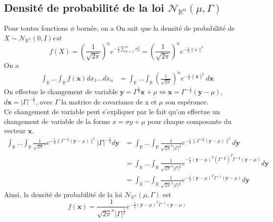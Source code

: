 \documentclass{report}
\begin{document}
		\subsection{Densité de probabilité de la loi $\mathcal{N}_{\mathbb{R}^n}(\mu, \Gamma)$}
			Pour toutes fonctions $\phi$ bornée, on a
			On sait que la densité de probabilité de $X \sim \mathcal{N}_{\mathbb{R}^n}(0, I) est $
			\[ f(X) = (\frac{1}{\sqrt{2\pi}})^ne^{-\frac{1}{2}\sum\limits_{k=1}^{n}x_k^2} = (\frac{1}{\sqrt{2\pi}})^ne^{-\frac{1}{2} \lVert x \rVert^2}  \]
			On a 
			\begin{align*}
				\int_\mathbb{R} \ldots \int_\mathbb{R} f(\textbf{x}) dx_1 \ldots dx_n &= \int_\mathbb{R} \ldots \int_\mathbb{R} (\frac{1}{\sqrt{2\pi}})^ne^{-\frac{1}{2} \lVert \textbf{x} \rVert^2} d\textbf{x}
			\end{align*}
			On effectue le changement de variable $\textbf{y} = \Gamma^{\frac{1}{2}} \textbf{x} + \mu \Leftrightarrow \textbf{x} = \Gamma^{-\frac{1}{2}}(\textbf{y} - \mu)$, $d\textbf{x} = |\Gamma|^{-\frac{1}{2}}$, avec $\Gamma$ la matrice de covariance de x et $\mu$ son espérance.\\
			Ce changement de variable peut s'expliquer par le fait qu'on effectue un changement de variable de la forme $x = \sigma y + \mu$ pour chaque composante du vecteur $\textbf{x}$.\\
			\begin{align*}
				\int_\mathbb{R} \ldots \int_\mathbb{R} \frac{1}{\sqrt{2\pi}^n}e^{-\frac{1}{2} \lVert \Gamma^{-\frac{1}{2}}(\textbf{y} - \mu) \rVert^2} |\Gamma|^{-\frac{1}{2}} d\textbf{y} &= \int_\mathbb{R} \ldots \int_\mathbb{R} \frac{1}{\sqrt{2\pi}^n |\Gamma|^{\frac{1}{2}}}e^{-\frac{1}{2} \lVert \Gamma^{-\frac{1}{2}}(\textbf{y} - \mu) \rVert^2} d\textbf{y}\\
				&= \int_\mathbb{R} \ldots \int_\mathbb{R} \frac{1}{\sqrt{2\pi}^n |\Gamma|^{\frac{1}{2}}}e^{-\frac{1}{2} (\textbf{y} - \mu)^T(\Gamma^{-\frac{1}{2}})^T\Gamma^{-\frac{1}{2}}(\textbf{y} - \mu) } d\textbf{y}\\
				&= \int_\mathbb{R} \ldots \int_\mathbb{R} \frac{1}{\sqrt{2\pi}^n |\Gamma|^{\frac{1}{2}}}e^{-\frac{1}{2} (\textbf{y} - \mu)^T\Gamma^{-1}(\textbf{y} - \mu) } d\textbf{y}
			\end{align*}
			Ainsi, la densité de probabilité de la loi $\mathcal{N}_{\mathbb{R}^n}(\mu, \Gamma)$ est
			\[ f(\textbf{x}) = \frac{1}{\sqrt{2\pi}^n |\Gamma|^{\frac{1}{2}}}e^{-\frac{1}{2} (\textbf{y} - \mu)^T\Gamma^{-1}(\textbf{y} - \mu) } \]
\end{document}

